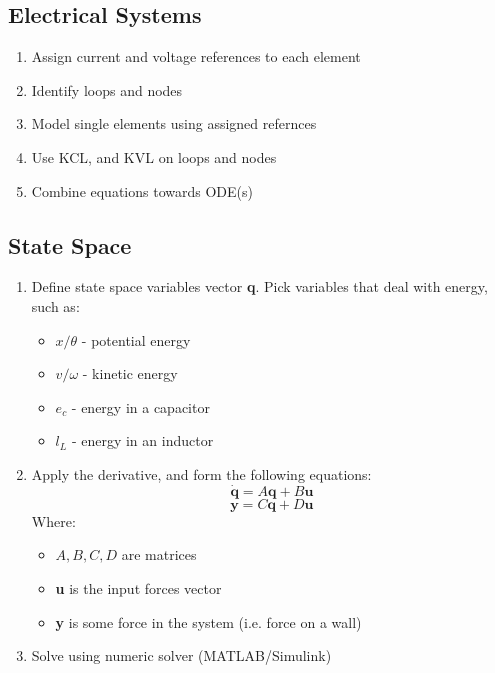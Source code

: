 \documentclass[twocolumn, 12pt]{article}
\begin{document}
%
\subsection*{Electrical Systems}
\begin{enumerate}
    \item Assign current and voltage references to each element
    \item Identify loops and nodes
    \item Model single elements using assigned refernces
    \item Use KCL, and KVL on loops and nodes
    \item Combine equations towards ODE(s)
\end{enumerate}



%
\subsection*{State Space}
\begin{enumerate}
    \item Define state space variables vector \textbf{q}. Pick variables that deal with energy, such as:
    \begin{itemize}
        \item \(x/\theta\) - potential energy
        \item \(v/\omega\) - kinetic energy
        \item \(e_c\)  - energy in a capacitor
        \item \(l_L\)   - energy in an inductor
    \end{itemize}
    \item Apply the derivative, and form the following equations:
    \begin{equation*}
        \dot{\textbf{q}} = A\textbf{q} + B\textbf{u}
    \end{equation*}
    \begin{equation*}
        \textbf{y} = C\textbf{q}+D\textbf{u}
    \end{equation*}
    Where:
    \begin{itemize}

        \item \(A, B, C, D\) are matrices
        \item \textbf{u} is the input forces vector
        \item \textbf{y} is some force in the system (i.e. force on a wall)
    \end{itemize}
    \item Solve using numeric solver (MATLAB/Simulink)
\end{enumerate}
\end{document}
